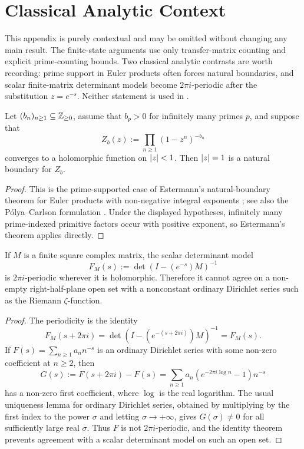 \section{Classical Analytic Context}
\label{sec:analytic}

This appendix is purely contextual and may be omitted without changing
any main result. The finite-state arguments use only transfer-matrix
counting and explicit prime-counting bounds. Two classical analytic
contrasts are worth recording: prime support in Euler products often
forces natural boundaries, and scalar finite-matrix determinant models
become \(2\pi i\)-periodic after the substitution \(z=e^{-s}\). Neither
statement is used in
.

\begin{theorem}
  \label{thm:euler-product-natural-boundary}
  Let \((b_n)_{n\ge1}\subseteq\mathbb{Z}_{\ge0}\), assume that \(b_p>0\) for
  infinitely many primes \(p\), and suppose that
  \[
    Z_b(z):=\prod_{n\ge1}(1-z^n)^{-b_n}
  \]
  converges to a holomorphic function on \(\lvert z \rvert<1\). Then
  \(\lvert z \rvert=1\) is a natural boundary for \(Z_b\).
\end{theorem}

\begin{proof}
  This is the prime-supported case of Estermann's natural-boundary
  theorem for Euler products with non-negative integral exponents
  \cite{Estermann1928}; see also the P\'olya--Carlson formulation
  \cite{Polya1923,Carlson1921}. Under the displayed hypotheses,
  infinitely many prime-indexed primitive factors occur with positive
  exponent, so Estermann's theorem applies directly.
\end{proof}

\begin{proposition}
  \label{prop:finite-zeta-imaginary-periodicity}
  If \(M\) is a finite square complex matrix, the scalar determinant
  model
  \[
    F_M(s):=\det(I-(e^{-s})M)^{-1}
  \]
  is \(2\pi i\)-periodic wherever it is holomorphic. Therefore it
  cannot agree on a non-empty right-half-plane open set with a
  nonconstant ordinary Dirichlet series such as the Riemann
  \(\zeta\)-function.
\end{proposition}

\begin{proof}
  The periodicity is the identity
  \[
    F_M(s+2\pi i)
    =\det(I-(e^{-(s+2\pi i)})M)^{-1}
    =F_M(s).
  \]
  If \(F(s)=\sum_{n\ge1}a_nn^{-s}\) is an ordinary Dirichlet series with
  some non-zero coefficient at \(n\ge2\), then
  \[
    G(s):=F(s+2\pi i)-F(s)
      =\sum_{n\ge1}a_n(e^{-2\pi i\log n}-1)n^{-s}
  \]
  has a non-zero first coefficient, where \(\log\) is the real
  logarithm. The usual uniqueness lemma for ordinary Dirichlet series,
  obtained by multiplying by the first index to the power \(\sigma\)
  and letting \(\sigma\to+\infty\), gives \(G(\sigma)\ne0\) for all
  sufficiently large real \(\sigma\). Thus \(F\) is not
  \(2\pi i\)-periodic, and the identity theorem prevents agreement with
  a scalar determinant model on such an open set.
\end{proof}
